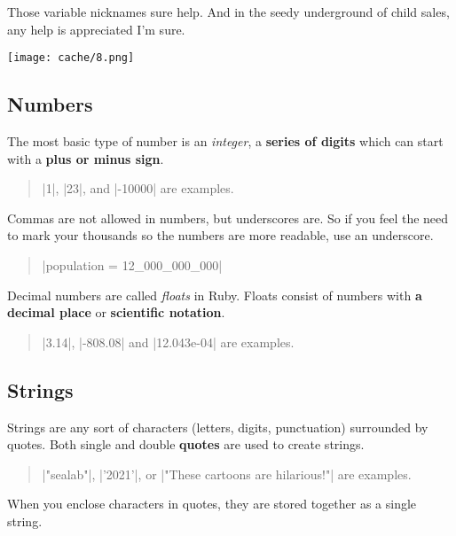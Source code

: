 \documentclass[12pt,twoside]{report}
\begin{document}
Those variable nicknames sure help.  And in the seedy underground of
child sales, any help is appreciated I'm sure.

	\texttt{[image: cache/8.png]}




\subsection{Numbers}



The most basic type of number is an {\em integer}, a {\bf series of
  digits} which can start with a {\bf plus or minus sign}.

\begin{quote}
\rubyinline|1|, \rubyinline|23|, and
\rubyinline|-10000| are examples.\end{quote}


Commas are not allowed in numbers, but underscores are.  So if you
feel the need to mark your thousands so the numbers are more readable,
use an underscore.

\begin{quote}
\rubyinline|population = 12_000_000_000|\end{quote}


Decimal numbers are called {\em floats} in Ruby.  Floats consist of
numbers with {\bf a decimal place} or {\bf scientific notation}.

\begin{quote}
\rubyinline|3.14|,
\rubyinline|-808.08| and
\rubyinline|12.043e-04| are examples.\end{quote}





\subsection{Strings}



Strings are any sort of characters (letters, digits, punctuation)
surrounded by quotes.  Both single and double {\bf quotes} are used to
create strings.

\begin{quote}
\rubyinline|"sealab"|,
\rubyinline|'2021'|, or
\rubyinline|"These cartoons are hilarious!"| are
examples.\end{quote}


When you enclose characters in quotes, they are stored together as a
single string.
\end{document}
